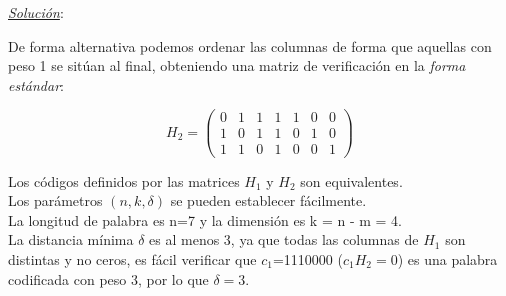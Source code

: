\documentclass{beamer}
\theoremstyle{plain}
\theoremstyle{example}
\theoremstyle{example}
\begin{document}
\begin{frame}  \small

\textit{\underline{Solución}}:\\
\vspace{0.3cm}

De forma alternativa podemos ordenar las columnas de forma que aquellas con peso 1  se sitúan al final, obteniendo una matriz de verificación en la \textit{forma estándar}:

\[
    H_2=   \left( \begin{array}{ccccccc}
     				  0 &   1   &   1  &   1 &	1 & 0 & 0\\ 
					  1 &   0   &   1  &   1 &	0 & 1 & 0\\ 
					  1 &   1   &   0  &   1 &	0 & 0 & 1
           			\end{array}
    		\right) 	    		
\]

Los códigos definidos por las matrices $H_1$ y $H_2$ son equivalentes.\\
\vspace*{5pt}
Los parámetros $(n,k,\delta)$ se pueden establecer fácilmente.\\
\vspace*{5pt}
La longitud de palabra es n=7 y la dimensión es k = n - m = 4. \\
\vspace*{5pt}
La distancia mínima $\delta$ es al menos 3, ya que todas las columnas de $H_1$ son distintas y no ceros, es fácil verificar que $c_1$=1110000 ($c_1 H_2=0$) es una palabra codificada con peso 3, por lo que $\delta =3$.


\end{frame} 
\end{document}
